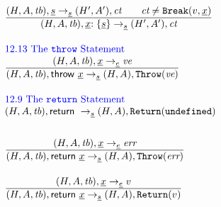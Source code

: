 \documentclass[a4paper, leqno]{amsart}
\newcommand{\rulesep}{\quad\quad}
\newcommand{\stmt}{s}
\newcommand{\expr}{e}
\newcommand{\ir}[1]{\ensuremath{\underline{#1}}}
\newcommand{\irid}{\ir{x}}
\def\inblue{\color{blue}}
\newcommand{\false}{{\tt false}}
\newcommand{\true}{{\tt true}}
\newcommand{\tb}{\emph{tb}}
\newcommand{\err}{\emph{err}}
\newcommand{\ct}{\emph{ct}}
\newcommand{\hf}[1]{\emph{#1}}
\newcommand{\state}{\ensuremath{(H,A,\tb)}}
\newcommand{\res}{\ensuremath{(H,A)}}
\newcommand{\resp}{\ensuremath{(H',A')}}
\newcommand{\evale}{\ensuremath{(H,A,\tb)}}
\newcommand{\irlab}{\ensuremath{\ir{x} {\tt: \{} \ir\stmt {\tt\}}}}
\def\inblue{\color{blue}}
\begin{document}
\[\begin{array}{l@{~~}l@{~~}ll}
\frac{\begin{matrix}
\state, \ir\stmt \rightarrow_{\ir\stmt} \resp, \ct
\rulesep
\ct \not= {\tt Break}(v, \ir{x})
\end{matrix}}{\begin{matrix}
\state, \irlab \rightarrow_{\ir\stmt} \resp, \ct
\end{matrix}}
\\[2em]




\mbox{\inblue 12.13 The {\tt throw} Statement}\\
\frac{\begin{matrix}
\evale, \irid \rightarrow_{\ir\expr} \emph{ve}
\end{matrix}}{\begin{matrix}
\state, {\sf throw} \ \irid \rightarrow_{\ir\stmt} \res, {\tt Throw}(\emph{ve})
\end{matrix}}
\\[2em]


\mbox{\inblue 12.9 The {\tt return} Statement}\\
\state,{\sf return}\  \rightarrow_{\ir{\stmt}} \res,{\tt Return}(\tt{undefined})
\\[2em]

\frac{\begin{matrix}
\evale, \irid \rightarrow_{\ir\expr} \err
\end{matrix}}
{\begin{matrix}
\state,{\sf return}\ \irid  \rightarrow_{\ir{\stmt}} \res,{\tt Throw}(\err)
\end{matrix}}
\\[2em]

\frac{\begin{matrix}
\evale, \irid \rightarrow_{\ir\expr} v
\end{matrix}}
{\begin{matrix}
\state,{\sf return}\ \irid  \rightarrow_{\ir{\stmt}} \res,{\tt Return}(v)
\end{matrix}}
\\[2em]

\end{array}
\]
\end{document}
